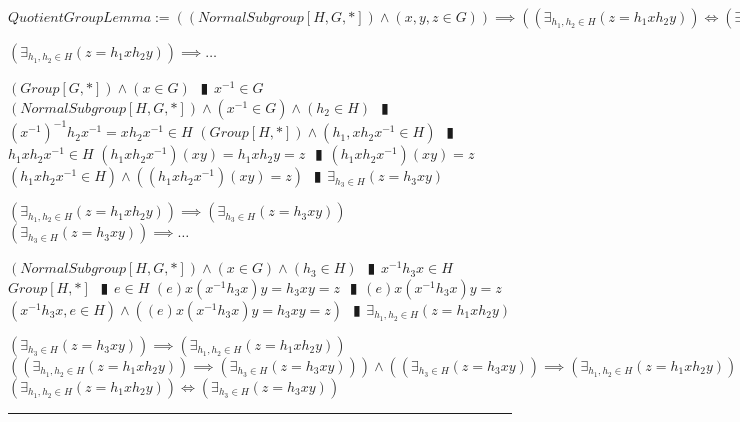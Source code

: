 \documentclass{book}
\newcommand{\abr}{:=}
\newcommand{\pipe}{$\phantom{(}\vrectangleblack\phantom{)}$}
\newcommand{\pr}[1]{\left(#1\right)}
\begin{document}
$QuotientGroupLemma \abr \pr{(NormalSubgroup[H, G, *]) \land (x, y, z \in G)} \implies \pr{\pr{\exists_{h_1, h_2 \in H}(z = h_1 x h_2 y)} \iff \pr{\exists_{h_3 \in H}(z = h_3 x y)}}$
\begin{enumerate}
  \lit $\pr{\exists_{h_1, h_2 \in H}(z = h_1 x h_2 y)} \implies \ldots$
  \begin{enumerate}
    \lit $(Group[G, *]) \land (x \in G)$ \pipe $x^{-1} \in G$
    \lit $(NormalSubgroup[H, G, *]) \land (x^{-1} \in G) \land (h_2 \in H)$ \pipe $(x^{-1})^{-1} h_2 x^{-1} = x h_2 x^{-1} \in H$
    \lit $(Group[H, *]) \land (h_1, x h_2 x^{-1} \in H)$ \pipe $h_1 x h_2 x^{-1} \in H$
    \lit $(h_1 x h_2 x^{-1}) (x y) = h_1 x h_2 y = z$ \pipe $(h_1 x h_2 x^{-1}) (x y) = z$
    \lit $(h_1 x h_2 x^{-1} \in H) \land \pr{(h_1 x h_2 x^{-1}) (x y) = z}$ \pipe $\exists_{h_3 \in H}(z = h_3 x y)$
  \end{enumerate}
  \lit $\pr{\exists_{h_1, h_2 \in H}(z = h_1 x h_2 y)} \implies \pr{\exists_{h_3 \in H}(z = h_3 x y)}$
  \lit $\pr{\exists_{h_3 \in H}(z = h_3 x y)} \implies \ldots$
  \begin{enumerate}
    \lit $(NormalSubgroup[H, G, *]) \land (x \in G) \land (h_3 \in H)$ \pipe $x^{-1} h_3 x \in H$
    \lit $Group[H, *]$ \pipe $e \in H$
    \lit $(e) x (x^{-1} h_3 x) y = h_3 x y = z$ \pipe $(e) x (x^{-1} h_3 x) y = z$
    \lit $(x^{-1} h_3 x, e \in H) \land \pr{(e) x (x^{-1} h_3 x) y = h_3 x y = z}$ \pipe $\exists_{h_1, h_2 \in H}(z = h_1 x h_2 y)$
  \end{enumerate}
  \lit $\pr{\exists_{h_3 \in H}(z = h_3 x y)} \implies \pr{\exists_{h_1, h_2 \in H}(z = h_1 x h_2 y)}$
  \lit $\pr{\pr{\exists_{h_1, h_2 \in H}(z = h_1 x h_2 y)} \implies \pr{\exists_{h_3 \in H}(z = h_3 x y)}} \land \pr{\pr{\exists_{h_3 \in H}(z = h_3 x y)} \implies \pr{\exists_{h_1, h_2 \in H}(z = h_1 x h_2 y)}}$
  \lit $\pr{\exists_{h_1, h_2 \in H}(z = h_1 x h_2 y)} \iff \pr{\exists_{h_3 \in H}(z = h_3 x y)}$
\end{enumerate} \vspace{.75mm} \hrule \vspace{.75mm} \ \\ 
\end{document}
